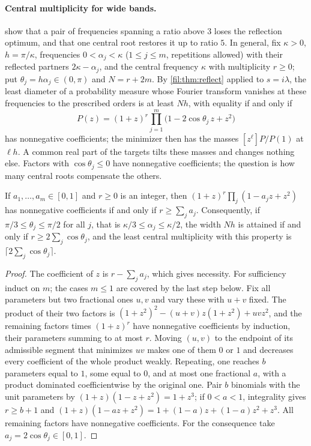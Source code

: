 \paragraph{Central multiplicity for wide bands.}
 show that a pair of frequencies spanning a ratio above $3$ loses the
reflection optimum, and that one central root restores it up to ratio $5$. In general, fix $\kappa>0$,
$h=\pi/\kappa$, frequencies $0<\alpha_j<\kappa$ ($1\le j\le m$, repetitions allowed) with their reflected
partners $2\kappa-\alpha_j$, and the central frequency $\kappa$ with multiplicity $r\ge0$; put
$\theta_j=h\alpha_j\in(0,\pi)$ and $N=r+2m$. By \cref{fil:thm:reflect} applied to $s=i\lambda$, the least
diameter of a probability measure whose Fourier transform vanishes at these frequencies to the prescribed
orders is at least $Nh$, with equality if and only if
\[
 P(z)=(1+z)^r\prod_{j=1}^m\bigl(1-2\cos\theta_j\,z+z^2\bigr)
\]
has nonnegative coefficients; the minimizer then has the masses $[z^\ell]P/P(1)$ at $\ell h$. A common real
part of the targets tilts these masses and changes nothing else. Factors with $\cos\theta_j\le0$ have
nonnegative coefficients; the question is how many central roots compensate the others.

\begin{theorem}\label{fil:thm:central}
If $a_1,\dots,a_m\in[0,1]$ and $r\ge0$ is an integer, then $(1+z)^r\prod_j(1-a_jz+z^2)$ has
nonnegative coefficients if and only if $r\ge\sum_ja_j$. Consequently, if $\pi/3\le\theta_j\le\pi/2$ for
all $j$, that is $\kappa/3\le\alpha_j\le\kappa/2$, the width $Nh$ is attained if and only if
$r\ge2\sum_j\cos\theta_j$, and the least central multiplicity with this property is
$\lceil2\sum_j\cos\theta_j\rceil$.
\end{theorem}

\begin{proof}
The coefficient of $z$ is $r-\sum_ja_j$, which gives necessity. For sufficiency induct on $m$; the cases
$m\le1$ are covered by the last step below. Fix all parameters but two fractional ones $u,v$ and vary these
with $u+v$ fixed. The product of their two factors is $(1+z^2)^2-(u+v)z(1+z^2)+uvz^2$, and the remaining
factors times $(1+z)^r$ have nonnegative coefficients by induction, their parameters summing to at most $r$.
Moving $(u,v)$ to the endpoint of its admissible segment that minimizes $uv$ makes one of them $0$ or $1$
and decreases every coefficient of the whole product weakly. Repeating, one reaches $b$ parameters equal to
$1$, some equal to $0$, and at most one fractional $a$, with a product dominated coefficientwise by the
original one. Pair $b$ binomials with the unit parameters by $(1+z)(1-z+z^2)=1+z^3$; if $0<a<1$, integrality
gives $r\ge b+1$ and $(1+z)(1-az+z^2)=1+(1-a)z+(1-a)z^2+z^3$. All remaining factors have nonnegative
coefficients. For the consequence take $a_j=2\cos\theta_j\in[0,1]$.
\end{proof}

